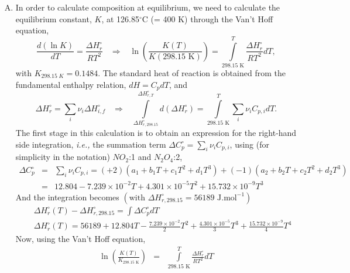 \documentclass[calculator,allquestions,datasheet,mock,Pens]{exam_newMarcus2}
\newcommand{\frc}{\displaystyle\frac}
\newcommand{\ie}{{\it i.e., }}
\newcommand{\summation}[3][error]{\sum\limits_{#2}^{#3}#1}
\begin{document}
\begin{question}
\begin{enumerate}[a)]
{\begin{enumerate}[A.]
        \item In order to calculate composition at equilibrium, we need to calculate the equilibrium constant, $K$, at 126.85$^{\circ}$C (= 400 K) through the Van't Hoff equation,
\begin{displaymath}
    \frc{d\left(\ln{K}\right)}{dT} = \frc{\Delta H^{\circ}_{r}}{RT^{2}} \;\;\;\Longrightarrow \;\;\; \ln{\left(\frc{K(T)}{K(298.15\text{ K})}\right)} = \int\limits_{298.15\text{ K}}^{T}\frc{\Delta H^{\circ}_{r}}{RT^{2}}dT,
\end{displaymath}
with $K_{298.15\;K}=0.1484$. The standard heat of reaction is obtained from the fundamental enthalpy relation, $dH= C_{p}dT$, and~
\begin{displaymath}
     \Delta H^{\circ}_{r} = \summation[\nu_{i}\Delta H^{\circ}_{i,f}]{i}{} \;\;\;\Longrightarrow\;\;\; \int\limits_{\Delta H^{\circ}_{r,298.15}}^{\Delta H^{\circ}_{r,T}}d\left(\Delta H^{\circ}_{r}\right) = \int\limits_{298.15\text{ K}}^{T}\summation[\nu_{i} C_{p,i}]{i}{}dT.
\end{displaymath}
The first stage in this calculation is to obtain an expression for the right-hand side integration, \ie the summation term $\Delta C_{p}^{\circ} = \summation[\nu_{i} C_{p,i}]{i}{}$, using (for simplicity in the notation) $NO_{2}$:1 and $N_{2}O_{4}$:2,
\begin{eqnarray}
   \Delta C_{p}^{\circ} &=& \summation[\nu_{i} C_{p,i}]{i}{} = (+2) \left(a_{1}+b_{1}T+c_{1}T^{2}+d_{1}T^{3}\right) + (-1)\left(a_{2}+b_{2}T+c_{2}T^{2}+d_{2}T^{3}\right) \nonumber \\
                     &=& 12.804 - 7.239\times 10^{-2}T + 4.301\times 10^{-5} T^{2} + 15.732\times 10^{-9}T^{3} \nonumber 
\end{eqnarray}
And the integration becomes $\left(\text{with }\Delta H^{\circ}_{r,298.15} = 56189\text{ J.mol}^{-1}\right)$~
\begin{eqnarray}
    && \Delta H^{\circ}_{r}(T) - \Delta H^{\circ}_{r,298.15} = \int\Delta C_{p}^{\circ}dT \nonumber \\
    && \Delta H^{\circ}_{r}(T) = 56189 + 12.804 T - \frc{7.239\times 10^{-2}}{2}T^{2} + \frc{4.301\times 10^{-5}}{3}T^{3} + \frc{15.732\times 10^{-9}}{4}T^{4} \nonumber
\end{eqnarray}
Now, using the Van't Hoff equation,~
\begin{eqnarray}
  \ln{\left(\frc{K(T)}{K_{298.15\text{ K}}}\right)} &=& \int\limits_{298.15\text{ K}}^{T}\frc{\Delta H^{\circ}_{r}}{RT^{2}}dT \nonumber \\

\end{eqnarray}
\end{enumerate}}
\end{enumerate}
\end{question}
\end{document}
